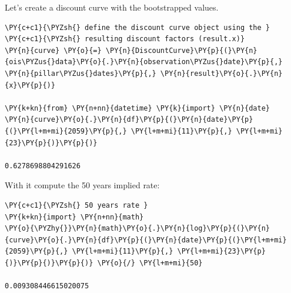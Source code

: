 Let's create a discount curve with the bootstrapped values.
\begin{tcolorbox}[breakable, size=fbox, boxrule=1pt, pad at break*=1mm,colback=cellbackground, colframe=cellborder]
\begin{Verbatim}[commandchars=\\\{\}]
\PY{c+c1}{\PYZsh{} define the discount curve object using the }
\PY{c+c1}{\PYZsh{} resulting discount factors (result.x)}
\PY{n}{curve} \PY{o}{=} \PY{n}{DiscountCurve}\PY{p}{(}\PY{n}{ois\PYZus{}data}\PY{o}{.}\PY{n}{observation\PYZus{}date}\PY{p}{,} \PY{n}{pillar\PYZus{}dates}\PY{p}{,} \PY{n}{result}\PY{o}{.}\PY{n}{x}\PY{p}{)}

\PY{k+kn}{from} \PY{n+nn}{datetime} \PY{k}{import} \PY{n}{date}
\PY{n}{curve}\PY{o}{.}\PY{n}{df}\PY{p}{(}\PY{n}{date}\PY{p}{(}\PY{l+m+mi}{2059}\PY{p}{,} \PY{l+m+mi}{11}\PY{p}{,} \PY{l+m+mi}{23}\PY{p}{)}\PY{p}{)}

0.6278698804291626
\end{Verbatim}
\end{tcolorbox}

With it compute the 50 years implied rate:
\begin{tcolorbox}[breakable, size=fbox, boxrule=1pt, pad at break*=1mm,colback=cellbackground, colframe=cellborder]
\begin{Verbatim}[commandchars=\\\{\}]
\PY{c+c1}{\PYZsh{} 50 years rate }
\PY{k+kn}{import} \PY{n+nn}{math}
\PY{o}{\PYZhy{}}\PY{n}{math}\PY{o}{.}\PY{n}{log}\PY{p}{(}\PY{n}{curve}\PY{o}{.}\PY{n}{df}\PY{p}{(}\PY{n}{date}\PY{p}{(}\PY{l+m+mi}{2059}\PY{p}{,} \PY{l+m+mi}{11}\PY{p}{,} \PY{l+m+mi}{23}\PY{p}{)}\PY{p}{)}\PY{p}{)} \PY{o}{/} \PY{l+m+mi}{50}

0.009308446615020075
\end{Verbatim}
\end{tcolorbox}
